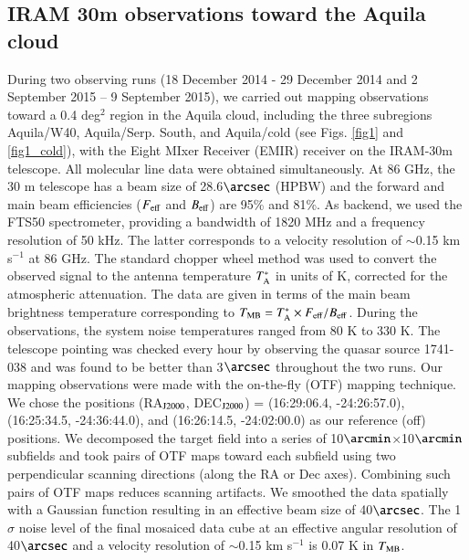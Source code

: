 \documentclass{aa}
\begin{document}
\subsection{IRAM 30m observations toward the Aquila cloud}
During two observing runs (18 December 2014 - 29 December 2014 and 2 September 2015 -- 9 September 2015), we carried out mapping observations toward a 0.4 deg$^{2}$ region in the Aquila cloud, including the three subregions Aquila/W40, Aquila/Serp. South, and Aquila/cold (see Figs. \ref{fig1} and \ref{fig1_cold}), with the Eight MIxer Receiver (EMIR) receiver on the IRAM-30m telescope. All molecular line data were obtained simultaneously. At 86 GHz, the 30 m telescope has a beam size of 28.6$\arcsec$ (HPBW) and {the forward and main beam efficiencies ($F_{\rm eff}$ and $B_{\rm eff}$) are 95\% and 81\%}.  As backend, we used the FTS50 spectrometer, providing a bandwidth of 1820 MHz and a frequency resolution of 50 kHz. The latter corresponds to a velocity resolution of $\sim$0.15 km s$^{-1}$ at 86 GHz.  
The standard chopper wheel method was used to convert the observed signal to the antenna temperature $T_{\rm A}^*$ in units of K, corrected for the atmospheric attenuation. The data are given in terms of the main beam brightness temperature corresponding to {$T_{\rm MB} = T_{\rm A}^* \times F_{\rm eff}/B_{\rm eff}$. }
During the  observations, the system noise temperatures ranged from 80 K to 330 K. 
The telescope pointing was checked every hour by observing the quasar source 1741-038 and was found to be better than 3$\arcsec$ throughout the two runs.  
Our mapping observations were made with the on-the-fly (OTF) mapping technique. 
We chose the positions (RA$_{\rm J2000}$, DEC$_{\rm J2000}$) = (16:29:06.4, -24:26:57.0), (16:25:34.5, -24:36:44.0), and (16:26:14.5, -24:02:00.0) 
as our reference (off) positions. 
We decomposed the target field into a series of 10$\arcmin$$\times$10$\arcmin$ subfields and took pairs of 
OTF maps toward each subfield using two perpendicular scanning directions (along the RA or Dec axes).
Combining such pairs of OTF maps reduces scanning artifacts.
We smoothed the data spatially with a Gaussian function resulting in an effective beam size of 40$\arcsec$. 
The 1$\sigma$ noise level of the final mosaiced data cube at an effective angular resolution of 40$\arcsec$ 
and a velocity resolution of $\sim$0.15 km s$^{-1}$ is 0.07 K in $T_{\rm MB}$.
\end{document}
